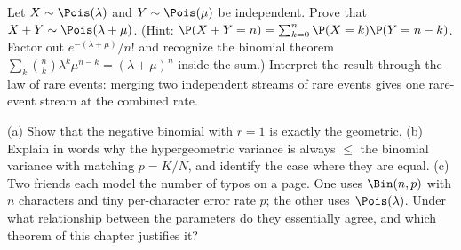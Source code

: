 \begin{exercise}
\label{ch07:exr-poissum}
Let $X \sim \Pois(\lambda)$ and $Y \sim \Pois(\mu)$ be independent. Prove that
$X + Y \sim \Pois(\lambda + \mu)$.
(Hint: $\P(X+Y = n) = \sum_{k=0}^{n}\P(X=k)\P(Y=n-k)$. Factor out
$e^{-(\lambda+\mu)}/n!$ and recognize the binomial theorem
$\sum_k \binom{n}{k}\lambda^k\mu^{n-k} = (\lambda+\mu)^n$ inside the sum.)
Interpret the result through the law of rare events: merging two independent
streams of rare events gives one rare-event stream at the combined rate.
\end{exercise}

\begin{exercise}
\label{ch07:exr-connect}
(a) Show that the negative binomial with $r=1$ is exactly the geometric.
(b) Explain in words why the hypergeometric variance is always $\le$ the binomial
variance with matching $p = K/N$, and identify the case where they are equal.
(c) Two friends each model the number of typos on a page. One uses $\Bin(n,p)$
with $n$ characters and tiny per-character error rate $p$; the other uses
$\Pois(\lambda)$. Under what relationship between the parameters do they
essentially agree, and which theorem of this chapter justifies it?
\end{exercise}
